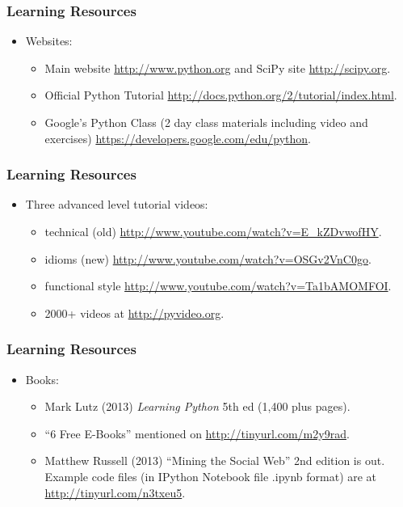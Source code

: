 \documentclass{beamer}
\begin{document}
\begin{frame}[fragile]
\frametitle{Learning Resources}
\begin{itemize}
\item Websites:
\begin{itemize}
\item Main website \url{http://www.python.org} and SciPy
      site \url{http://scipy.org}.
\item Official Python Tutorial
      \url{http://docs.python.org/2/tutorial/index.html}.
\item Google's Python Class (2 day class materials including
      video and exercises) 
      \url{https://developers.google.com/edu/python}.
\end{itemize}
\end{itemize}
\end{frame}

\begin{frame}[fragile]
\frametitle{Learning Resources}
\begin{itemize}
\item Three advanced level tutorial videos:
\begin{itemize}
\item technical (old)
      \url{http://www.youtube.com/watch?v=E_kZDvwofHY}.
\item idioms (new) 
      \url{http://www.youtube.com/watch?v=OSGv2VnC0go}.
\item functional style
      \url{http://www.youtube.com/watch?v=Ta1bAMOMFOI}.
\item 2000+ videos at \url{http://pyvideo.org}.
\end{itemize}
\end{itemize}
\end{frame}

\begin{frame}[fragile]
\frametitle{Learning Resources}
\begin{itemize}
\item Books:
\begin{itemize}
\item Mark Lutz (2013) \emph{Learning Python} 5th ed 
      (1,400 plus pages).
\item ``6 Free E-Books'' mentioned on 
      \url{http://tinyurl.com/m2y9rad}.
\item Matthew Russell (2013) ``Mining the Social Web''
      2nd edition is out. Example code files (in IPython
      Notebook file .ipynb format) are 
      at \url{http://tinyurl.com/n3txeu5}.
\end{itemize}
\end{itemize}
\end{frame}
\end{document}
